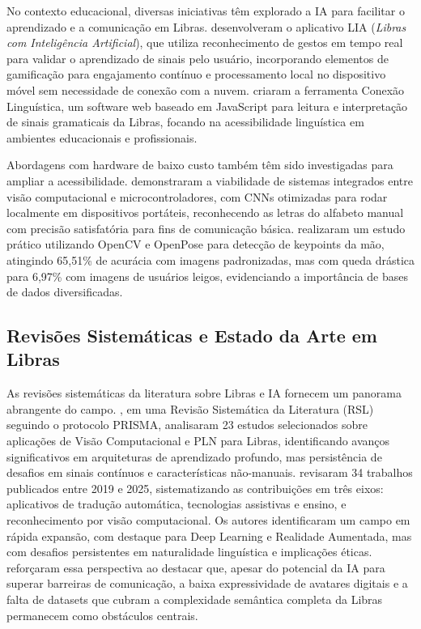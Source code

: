 No contexto educacional, diversas iniciativas têm explorado a IA para facilitar o aprendizado e a comunicação em Libras.  desenvolveram o aplicativo LIA (\textit{Libras com Inteligência Artificial}), que utiliza reconhecimento de gestos em tempo real para validar o aprendizado de sinais pelo usuário, incorporando elementos de gamificação para engajamento contínuo e processamento local no dispositivo móvel sem necessidade de conexão com a nuvem.  criaram a ferramenta Conexão Linguística, um software web baseado em JavaScript para leitura e interpretação de sinais gramaticais da Libras, focando na acessibilidade linguística em ambientes educacionais e profissionais.

Abordagens com hardware de baixo custo também têm sido investigadas para ampliar a acessibilidade.  demonstraram a viabilidade de sistemas integrados entre visão computacional e microcontroladores, com CNNs otimizadas para rodar localmente em dispositivos portáteis, reconhecendo as letras do alfabeto manual com precisão satisfatória para fins de comunicação básica.  realizaram um estudo prático utilizando OpenCV e OpenPose para detecção de keypoints da mão, atingindo 65,51\% de acurácia com imagens padronizadas, mas com queda drástica para 6,97\% com imagens de usuários leigos, evidenciando a importância de bases de dados diversificadas.

\subsection{Revisões Sistemáticas e Estado da Arte em Libras}

As revisões sistemáticas da literatura sobre Libras e IA fornecem um panorama abrangente do campo. , em uma Revisão Sistemática da Literatura (RSL) seguindo o protocolo PRISMA, analisaram 23 estudos selecionados sobre aplicações de Visão Computacional e PLN para Libras, identificando avanços significativos em arquiteturas de aprendizado profundo, mas persistência de desafios em sinais contínuos e características não-manuais.  revisaram 34 trabalhos publicados entre 2019 e 2025, sistematizando as contribuições em três eixos: aplicativos de tradução automática, tecnologias assistivas e ensino, e reconhecimento por visão computacional. Os autores identificaram um campo em rápida expansão, com destaque para Deep Learning e Realidade Aumentada, mas com desafios persistentes em naturalidade linguística e implicações éticas.  reforçaram essa perspectiva ao destacar que, apesar do potencial da IA para superar barreiras de comunicação, a baixa expressividade de avatares digitais e a falta de datasets que cubram a complexidade semântica completa da Libras permanecem como obstáculos centrais.

